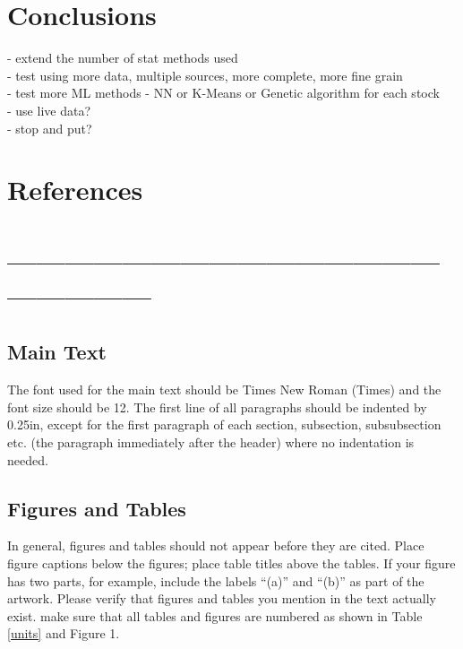 \documentclass[12pt,a4paper]{article}
\begin{document}
\iffalse
#################################################################################
\fi

\section{Conclusions}

\iffalse
This section summarises the main points of this paper.  Do not replicate the abstract as the conclusion.  A conclusion might elaborate on the importance of the work or suggest applications and extensions.  This section should be no more than 1 page in length.
\fi

- extend the number of stat methods used \\
- test using more data, multiple sources, more complete, more fine grain \\
- test more ML methods - NN or K-Means or Genetic algorithm for each stock\\
- use live data? \\
- stop and put? \\

\iffalse
#################################################################################
\fi

\section{References}



\iffalse
#################################################################################
\fi

\iffalse
\section*{------------------------------------------------------------}

\subsection{Main Text}

The font used for the main text should be Times New Roman (Times) and the font size should be 12.  The first line of all paragraphs should be indented by 0.25in, except for the first paragraph of each section, subsection, subsubsection etc. (the paragraph immediately after the header) where no indentation is needed.

\subsection{Figures and Tables}
In general, figures and tables should not appear before they are cited.  Place figure captions below the figures; place table titles above the tables.  If your figure has two parts, for example, include the labels ``(a)'' and ``(b)'' as part of the artwork.  Please verify that figures and tables you mention in the text actually exist.  make sure that all tables and figures are numbered as shown in Table \ref{units} and Figure 1.
\end{document}
